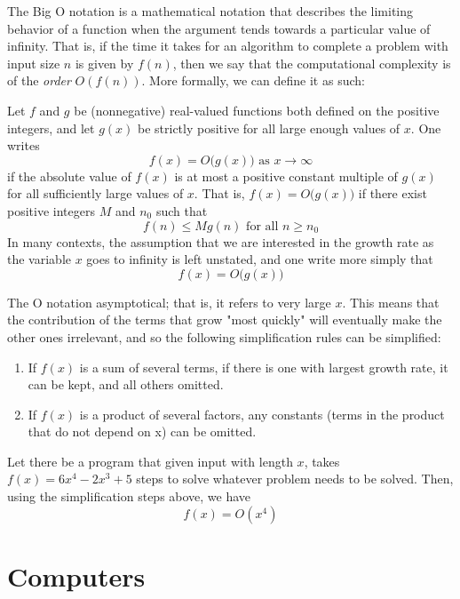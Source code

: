 \documentclass{article}
\begin{document}
  The Big O notation is a mathematical notation that describes the limiting behavior of a function when the argument tends towards a particular value of infinity. That is, if the time it takes for an algorithm to complete a problem with input size $n$ is given by $f(n)$, then we say that the computational complexity is of the \textit{order} $O(f(n))$. More formally, we can define it as such: 

  \begin{definition}
  Let $f$ and $g$ be (nonnegative) real-valued functions both defined on the positive integers, and let $g(x)$ be strictly positive for all large enough values of $x$. One writes
  \[f(x) = O\big( g(x)\big) \text{ as } x \rightarrow \infty\]
  if the absolute value of $f(x)$ is at most a positive constant multiple of $g(x)$ for all sufficiently large values of $x$. That is, $f(x) = O \big(g(x)\big)$ if there exist positive integers $M$ and $n_0$ such that
  \[f(n) \leq M g(n) \text{ for all } n \geq n_0\]
  In many contexts, the assumption that we are interested in the growth rate as the variable $x$ goes to infinity is left unstated, and one write more simply that
  \[f(x) = O\big( g(x)\big)\]
  \end{definition}

  The O notation asymptotical; that is, it refers to very large $x$. This means that the contribution of the terms that grow "most quickly" will eventually make the other ones irrelevant, and so the following simplification rules can be simplified: 
  \begin{enumerate}
      \item If $f(x)$ is a sum of several terms, if there is one with largest growth rate, it can be kept, and all others omitted.
      \item If $f(x)$ is a product of several factors, any constants (terms in the product that do not depend on x) can be omitted.
  \end{enumerate}

  \begin{example}
  Let there be a program that given input with length $x$, takes $f(x) = 6x^4 - 2x^3 + 5$ steps to solve whatever problem needs to be solved. Then, using the simplification steps above, we have 
  \[f(x) = O(x^4)\]
  \end{example}

\section{Computers}
\end{document}
